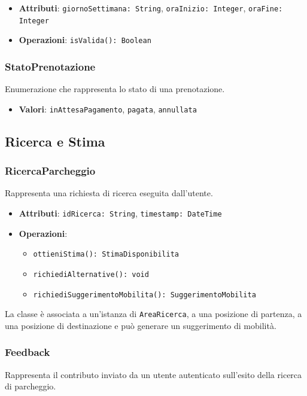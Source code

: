 \documentclass[12pt,a4paper]{article}
\begin{document}
\begin{itemize}
    \item \textbf{Attributi}: \texttt{giornoSettimana: String}, \texttt{oraInizio: Integer}, \texttt{oraFine: Integer}
    \item \textbf{Operazioni}: \texttt{isValida(): Boolean}
\end{itemize}

\subsubsection{StatoPrenotazione}
Enumerazione che rappresenta lo stato di una prenotazione.

\begin{itemize}
    \item \textbf{Valori}: \texttt{inAttesaPagamento}, \texttt{pagata}, \texttt{annullata}
\end{itemize}

\subsection{Ricerca e Stima}

\subsubsection{RicercaParcheggio}
Rappresenta una richiesta di ricerca eseguita dall’utente.

\begin{itemize}
    \item \textbf{Attributi}: \texttt{idRicerca: String}, \texttt{timestamp: DateTime}
    \item \textbf{Operazioni}:
    \begin{itemize}
        \item \texttt{ottieniStima(): StimaDisponibilita}
        \item \texttt{richiediAlternative(): void}
        \item \texttt{richiediSuggerimentoMobilita(): SuggerimentoMobilita}
    \end{itemize}
\end{itemize}

La classe è associata a un’istanza di \texttt{AreaRicerca}, a una posizione di partenza, a una posizione di destinazione e può generare un suggerimento di mobilità.

\subsubsection{Feedback}
Rappresenta il contributo inviato da un utente autenticato sull’esito della ricerca di parcheggio.
\end{document}
